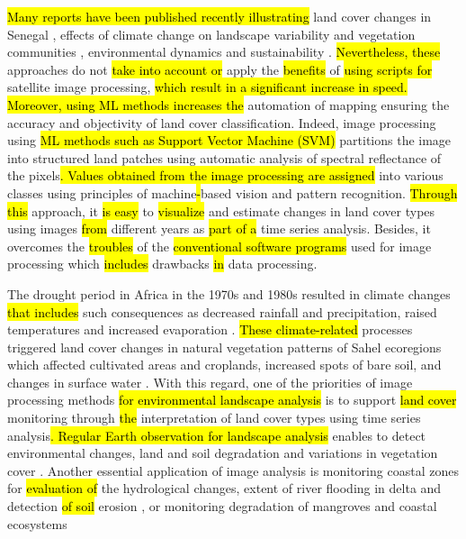 \documentclass[earth,article,submit,pdftex,moreauthors]{Definitions/mdpi}
\begin{document}
\hl{Many reports have been published recently illustrating} land cover changes in Senegal \cite{WOOD2004565,ELBERLING200337,Hiraldo}, effects of climate change on landscape variability and vegetation communities \cite{LIU2004583,TSCHAKERT2004535,LUFAFA20081}, environmental dynamics and sustainability \cite{CAMARA2017204}. \hl{Nevertheless, these} approaches do not \hl{take into account or} apply the \hl{benefits} of \hl{using scripts for} satellite image processing, \hl{which result in a significant increase in speed. Moreover, using ML methods increases the} automation of mapping ensuring the accuracy and objectivity of land cover classification. Indeed, image processing using \hl{ML methods such as Support Vector Machine (SVM) }partitions the image into structured land patches using automatic analysis of spectral reflectance of the pixels\hl{. Values obtained from the image processing are assigned }into various classes using principles of machine\hl{-}based vision and pattern recognition. \hl{Through this} approach, it \hl{is easy} to \hl{visualize} and estimate changes in land cover types using images \hl{from} different years as \hl{part of a} time series analysis. Besides, it overcomes the \hl{troubles} of the \hl{conventional software programs} used for image processing which \hl{includes} drawbacks \hl{in} data processing.

The drought period in Africa in the 1970s and 1980s resulted in climate changes\hl{ that includes }such consequences as decreased rainfall and precipitation, raised temperatures and increased evaporation \cite{Paturel,Lemenkova202217}. \hl{These climate-related} processes triggered land cover changes in natural vegetation patterns of Sahel ecoregions which affected cultivated areas and croplands, increased spots of bare soil, and changes in surface water \cite{Fritz,Lemenkova202313}. With this regard, one of the priorities of image processing methods \hl{for environmental landscape analysis }is to support \hl{land cover} monitoring through \hl{the} interpretation of land cover types using time series analysis\hl{. Regular Earth observation for landscape analysis }enables to detect environmental changes, land and soil degradation and variations in vegetation cover \cite{MBOW2008210}. Another essential application of image analysis is monitoring coastal zones for \hl{evaluation of} the hydrological changes, extent of river flooding in delta and detection \hl{of soil }erosion \cite{NDOUR201892,NGOM201634}, or monitoring degradation of mangroves and coastal ecosystems \cite{LOMBARD2023102027,CARNEY2014126}
\end{document}
